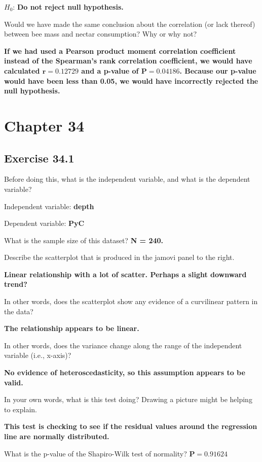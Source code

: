 \documentclass[
  openany]{krantz}
\begin{document}
\(H_{0}\): \textbf{Do not reject null hypothesis.}

Would we have made the same conclusion about the correlation (or lack thereof) between bee mass and nectar consumption? Why or why not?

\textbf{If we had used a Pearson product moment correlation coefficient instead of the Spearman's rank correlation coefficient, we would have calculated \(\mathbf{r = 0.12729}\) and a p-value of \(\mathbf{P = 0.04186}\). Because our p-value would have been less than 0.05, we would have incorrectly rejected the null hypothesis.}

\hypertarget{chapter-34}{%
\section{Chapter 34}\label{chapter-34}}

\hypertarget{exercise-34.1}{%
\subsection{Exercise 34.1}\label{exercise-34.1}}

Before doing this, what is the independent variable, and what is the dependent variable?

Independent variable: \textbf{depth}

Dependent variable: \textbf{PyC}

What is the sample size of this dataset? \textbf{N = 240.}

Describe the scatterplot that is produced in the jamovi panel to the right.

\textbf{Linear relationship with a lot of scatter. Perhaps a slight downward trend?}

In other words, does the scatterplot show any evidence of a curvilinear pattern in the data?

\textbf{The relationship appears to be linear.}

In other words, does the variance change along the range of the independent variable (i.e., x-axis)?

\textbf{No evidence of heteroscedasticity, so this assumption appears to be valid.}

In your own words, what is this test doing? Drawing a picture might be helping to explain.

\textbf{This test is checking to see if the residual values around the regression line are normally distributed.}

What is the p-value of the Shapiro-Wilk test of normality? \textbf{\(\mathbf{P = 0.91624}\)}
\end{document}
